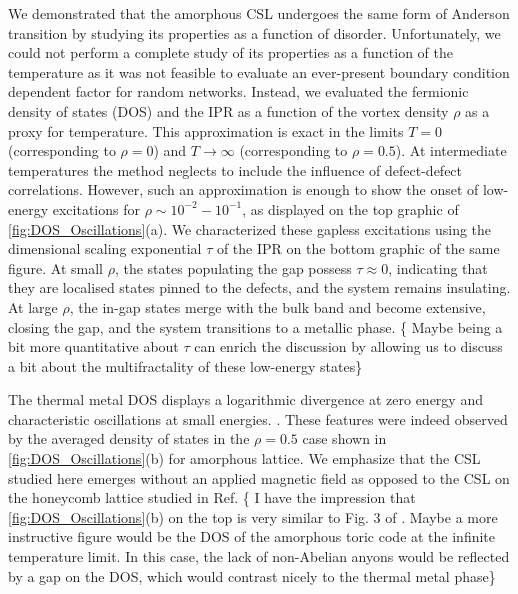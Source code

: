 \par

We demonstrated that the amorphous CSL undergoes the same form of
Anderson transition by studying its properties as a function of
disorder. Unfortunately, we could not perform a complete study of its
properties as a function of the temperature as it was not feasible to
evaluate an ever-present boundary condition dependent factor
\cite{pedrocchiPhysicalSolutionsKitaev2011,Zschocke_Physical_states2015}
for random networks. Instead, we evaluated the fermionic density of
states (DOS) and the IPR as a function of the vortex density \(\rho\) as
a proxy for temperature. This approximation is exact in the limits
\(T = 0\) (corresponding to \(\rho = 0\)) and \(T \to \infty\)
(corresponding to \(\rho = 0.5\)). At intermediate temperatures the
method neglects to include the influence of defect-defect correlations.
However, such an approximation is enough to show the onset of low-energy
excitations for \(\rho \sim 10^{-2}-10^{-1}\), as displayed on the top
graphic of \ref{fig:DOS_Oscillations}(a). We characterized these gapless
excitations using the dimensional scaling exponential \(\tau\) of the
IPR on the bottom graphic of the same figure. At small \(\rho\), the
states populating the gap possess \(\tau\approx0\), indicating that they
are localised states pinned to the defects, and the system remains
insulating. At large \(\rho\), the in-gap states merge with the bulk
band and become extensive, closing the gap, and the system transitions
to a metallic phase. \{\color{red} Maybe being a bit more quantitative
about \(\tau\) can enrich the discussion by allowing us to discuss a bit
about the multifractality of these low-energy states\}

\par

The thermal metal DOS displays a logarithmic divergence at zero energy
and characteristic oscillations at small energies.
\cite{bocquet_disordered_2000, selfThermallyInducedMetallic2019}. These
features were indeed observed by the averaged density of states in the
\(\rho = 0.5\) case shown in \cref{fig:DOS_Oscillations}(b) for
amorphous lattice. We emphasize that the CSL studied here emerges
without an applied magnetic field as opposed to the CSL on the honeycomb
lattice studied in Ref. \cite{selfThermallyInducedMetallic2019}
\{\color{red} I have the impression that \cref{fig:DOS_Oscillations}(b)
on the top is very similar to Fig. 3 of
\cite{selfThermallyInducedMetallic2019}. Maybe a more instructive figure
would be the DOS of the amorphous toric code at the infinite temperature
limit. In this case, the lack of non-Abelian anyons would be reflected
by a gap on the DOS, which would contrast nicely to the thermal metal
phase\}

